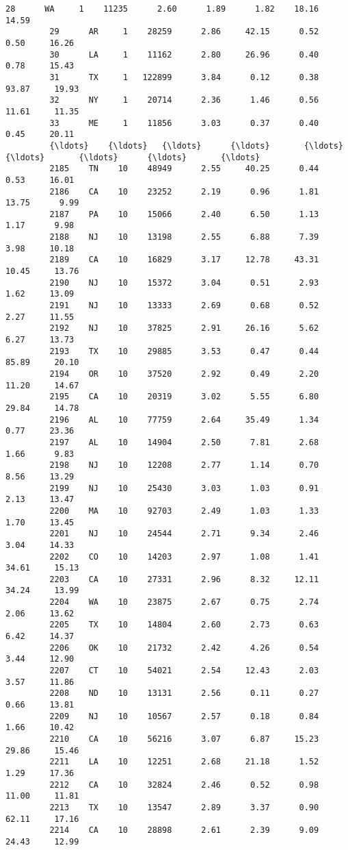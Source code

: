 \documentclass[11pt]{llncs}
\begin{document}
\begin{Verbatim}[commandchars=\\\{\}]
         28      WA     1    11235      2.60      1.89      1.82    18.16     14.59   
         29      AR     1    28259      2.86     42.15      0.52     0.50     16.26   
         30      LA     1    11162      2.80     26.96      0.40     0.78     15.43   
         31      TX     1   122899      3.84      0.12      0.38    93.87     19.93   
         32      NY     1    20714      2.36      1.46      0.56    11.61     11.35   
         33      ME     1    11856      3.03      0.37      0.40     0.45     20.11   
         {\ldots}    {\ldots}   {\ldots}      {\ldots}       {\ldots}       {\ldots}       {\ldots}      {\ldots}       {\ldots}   
         2185    TN    10    48949      2.55     40.25      0.44     0.53     16.01   
         2186    CA    10    23252      2.19      0.96      1.81    13.75      9.99   
         2187    PA    10    15066      2.40      6.50      1.13     1.17      9.98   
         2188    NJ    10    13198      2.55      6.88      7.39     3.98     10.18   
         2189    CA    10    16829      3.17     12.78     43.31    10.45     13.76   
         2190    NJ    10    15372      3.04      0.51      2.93     1.62     13.09   
         2191    NJ    10    13333      2.69      0.68      0.52     2.27     11.55   
         2192    NJ    10    37825      2.91     26.16      5.62     6.27     13.73   
         2193    TX    10    29885      3.53      0.47      0.44    85.89     20.10   
         2194    OR    10    37520      2.92      0.49      2.20    11.20     14.67   
         2195    CA    10    20319      3.02      5.55      6.80    29.84     14.78   
         2196    AL    10    77759      2.64     35.49      1.34     0.77     23.36   
         2197    AL    10    14904      2.50      7.81      2.68     1.66      9.83   
         2198    NJ    10    12208      2.77      1.14      0.70     8.56     13.29   
         2199    NJ    10    25430      3.03      1.03      0.91     2.13     13.47   
         2200    MA    10    92703      2.49      1.03      1.33     1.70     13.45   
         2201    NJ    10    24544      2.71      9.34      2.46     3.04     14.33   
         2202    CO    10    14203      2.97      1.08      1.41    34.61     15.13   
         2203    CA    10    27331      2.96      8.32     12.11    34.24     13.99   
         2204    WA    10    23875      2.67      0.75      2.74     2.06     13.62   
         2205    TX    10    14804      2.60      2.73      0.63     6.42     14.37   
         2206    OK    10    21732      2.42      4.26      0.54     3.44     12.90   
         2207    CT    10    54021      2.54     12.43      2.03     3.57     11.86   
         2208    ND    10    13131      2.56      0.11      0.27     0.66     13.81   
         2209    NJ    10    10567      2.57      0.18      0.84     1.66     10.42   
         2210    CA    10    56216      3.07      6.87     15.23    29.86     15.46   
         2211    LA    10    12251      2.68     21.18      1.52     1.29     17.36   
         2212    CA    10    32824      2.46      0.52      0.98    11.00     11.81   
         2213    TX    10    13547      2.89      3.37      0.90    62.11     17.16   
         2214    CA    10    28898      2.61      2.39      9.09    24.43     12.99   
         

\end{Verbatim}
\end{document}
